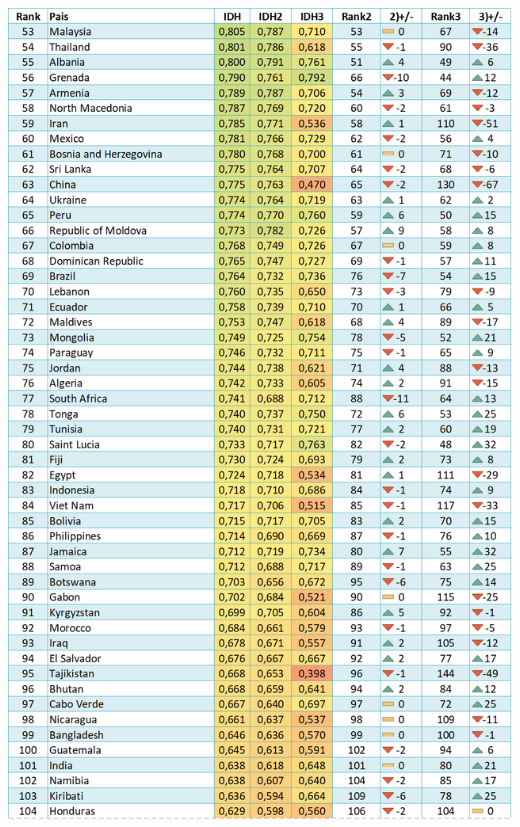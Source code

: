 \documentclass[
  10pt,
]{article}
\begin{document}
\begin{center}\includegraphics[width=14.92in]{Resultados/Tabla_IDH2} \end{center}
\pagebreak
\end{document}
